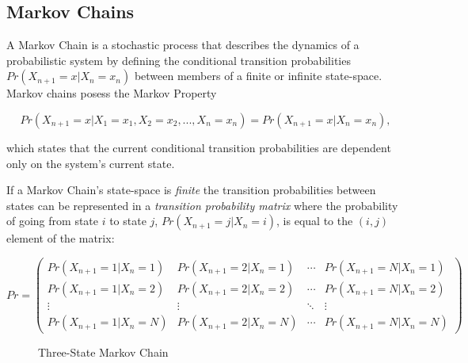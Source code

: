 \subsection{Markov Chains}
\label{subsec:markovchains}

A Markov Chain is a stochastic process that describes the dynamics of a probabilistic system by defining the conditional transition probabilities \(Pr(X_{n+1}=x|X_n=x_n)\) between members of a finite or infinite state-space. Markov chains posess the Markov Property

\[
Pr(X_{n+1}=x|X_1=x_1,X_2=x_2,...,X_n=x_n) = Pr(X_{n+1}=x|X_n=x_n),
\]

which states that the current conditional transition probabilities are dependent only on the system's current state.

If a Markov Chain's state-space is \textit{finite} the transition probabilities between states can be represented in a \textit{transition probability matrix} where the probability of going from state $i$ to state $j$, $Pr(X_{n+1}=j|X_n=i)$, is equal to the $(i,j)$ element of the matrix:

\[
 Pr =
 \begin{pmatrix}
  Pr(X_{n+1}=1|X_n=1) & Pr(X_{n+1}=2|X_n=1) & \cdots & Pr(X_{n+1}=N|X_n=1) \\
  Pr(X_{n+1}=1|X_n=2) & Pr(X_{n+1}=2|X_n=2) & \cdots & Pr(X_{n+1}=N|X_n=2) \\
  \vdots  & \vdots  & \ddots & \vdots  \\
  Pr(X_{n+1}=1|X_n=N) & Pr(X_{n+1}=2|X_n=N) & \cdots & Pr(X_{n+1}=N|X_n=N)
 \end{pmatrix}
\]

\begin{figure}[h!]
\begin{center}
\end{center}
\caption{Three-State Markov Chain}
\label{3statemarkovchain}
\end{figure}

